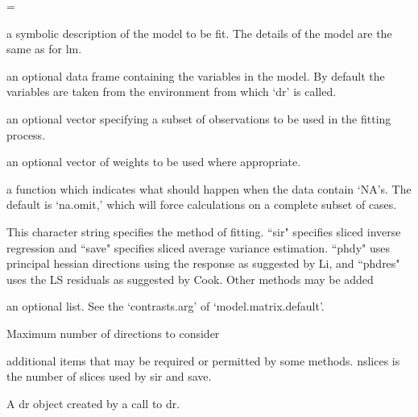\documentclass{article}
\makeatletter
\let\realnormalsize=\normalsize
\def\preveqno{}\let\real@float=\@float \let\realend@float=\end@float
\def\@float{\let\@savefreelist\@freelist\real@float}
\def\liih@math{\ifmmode$\else\bad@math\fi}
\def\end@float{\realend@float\global\let\@freelist\@savefreelist}
\def\adjustnormalsize{\def\normalsize{\mathsurround=0pt \realnormalsize
 \parindent=0pt\abovedisplayskip=0pt\belowdisplayskip=0pt}%
 \def\phantompar{\csname par\endcsname}\normalsize}%
\def\lthtmltypeout#1{{\let\protect\string \immediate\write\lthtmlwrite{#1}}}%
\newcommand\lthtmlvboxmathA{\adjustnormalsize\setbox\sizebox=\vbox\bgroup %
 \let\ifinner=\iffalse \let\)\liih@math }%
\newcommand\lthtmlboxmathZ{\@next\next\@currlist{}{\def\next{\voidb@x}}%
 \expandafter\box\next\egroup}%
\newcommand\lthtmlmathtype[1]{\gdef\lthtmlmathenv{#1}}%
\newcommand\lthtmllogmath{\lthtmltypeout{l2hSize %
:\lthtmlmathenv:\the\ht\sizebox::\the\dp\sizebox::\the\wd\sizebox.\preveqno}}%
\newcommand\lthtmlfigureA[1]{\let\@savefreelist\@freelist
       \lthtmlmathtype{#1}\lthtmlvboxmathA}%
\newcommand\lthtmlfigureZ{\lthtmlboxmathZ\lthtmllogmath\copy\sizebox
       \global\let\@freelist\@savefreelist}%
\def\lthtmlcheckvsize{\ifdim\ht\sizebox<\vsize 
  \ifdim\wd\sizebox<\hsize\expandafter\hfill\fi \expandafter\vfill
  \else\expandafter\vss\fi}%
\makeatother
\begin{document}
{\newpage\clearpage
\lthtmlfigureA{Arguments1787}%
\begin{Arguments}
\begin{ldescription}
\item[\code{formula}] a symbolic description of the model to be fit. The details of
the model are the same as for lm. 
\item[\code{data}] an optional data frame containing the variables in the model.
By default the variables are taken from the environment from
which `dr' is called.
\item[\code{subset}] an optional vector specifying a subset of observations to be
used in the fitting process.
\item[\code{weights}] an optional vector of weights to be used where appropriate.
\item[\code{na.action}] a function which indicates what should happen when the data
contain `NA's.  The default is `na.omit,' which will force
calculations on a complete subset of cases.
\item[\code{method}] This character string specifies the method of fitting.  ``sir"
specifies sliced inverse regression and ``save" specifies sliced
average variance estimation.  ``phdy" uses principal hessian
directions using the response as suggested by Li, and ``phdres" 
uses the LS residuals as suggested by Cook. Other methods may be
added
\item[\code{contrasts}] an optional list. See the `contrasts.arg' of
`model.matrix.default'.
\item[\code{numdir}] Maximum number of directions to consider
\item[\code{...}] additional items that may be required or permitted by some 
methods.
nslices is the number of slices used by sir and save.
\item[\code{object}] 
\end{ldescription}
 A dr object created by a call to dr.\end{Arguments}%
\lthtmlfigureZ
\lthtmlcheckvsize\clearpage}
\end{document}
